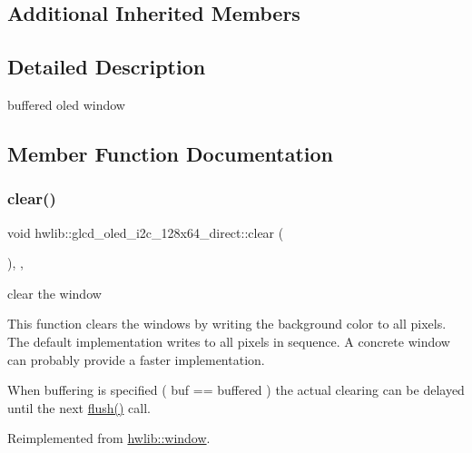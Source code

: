 \subsection*{Additional Inherited Members}


\subsection{Detailed Description}
buffered oled window 

\subsection{Member Function Documentation}
\mbox{\label{classhwlib_1_1glcd__oled__i2c__128x64__direct_a283c1ff2e898f5f2b23dfdce6209b55e}} 
\subsubsection{\texorpdfstring{clear()}{clear()}}
{\footnotesize\ttfamily void hwlib\+::glcd\+\_\+oled\+\_\+i2c\+\_\+128x64\+\_\+direct\+::clear (\begin{DoxyParamCaption}{ }\end{DoxyParamCaption})\hspace{0.3cm}{\ttfamily [inline]}, {\ttfamily [override]}, {\ttfamily [virtual]}}



clear the window 

This function clears the windows by writing the background color to all pixels. The default implementation writes to all pixels in sequence. A concrete window can probably provide a faster implementation.

When buffering is specified ( buf == buffered ) the actual clearing can be delayed until the next \hyperlink{classhwlib_1_1glcd__oled__i2c__128x64__direct_a65a496d65b3a99fe9334e0981b706533}{flush()} call. 

Reimplemented from \hyperlink{classhwlib_1_1window_a5e781163353ce26cb4dc5b2cbe40ad05}{hwlib\+::window}.

\mbox{\label{classhwlib_1_1glcd__oled__i2c__128x64__direct_a65a496d65b3a99fe9334e0981b706533}} 
